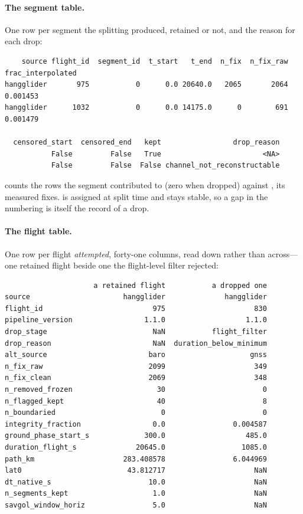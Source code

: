 \begin{revblock}
\paragraph{The segment table.} One row per segment the splitting produced, retained or
not, and the reason for each drop:

{\footnotesize
\begin{verbatim}
    source flight_id  segment_id  t_start   t_end  n_fix  n_fix_raw  frac_interpolated
hangglider       975           0      0.0 20640.0   2065       2064           0.001453
hangglider      1032           0      0.0 14175.0      0        691           0.001479

  censored_start  censored_end   kept                 drop_reason
           False         False   True                        <NA>
           False         False  False channel_not_reconstructable
\end{verbatim}
}

\noindent {} counts the rows the segment contributed to  (zero when
dropped) against , its measured fixes.  is assigned at
split time and stays stable, so a gap in the numbering is itself the record of a drop.

\paragraph{The flight table.} One row per flight \emph{attempted}, forty-one columns, read
down rather than across---one retained flight beside one the flight-level filter rejected:

{\footnotesize
\begin{verbatim}
                     a retained flight           a dropped one
source                      hangglider              hangglider
flight_id                          975                     830
pipeline_version                 1.1.0                   1.1.0
drop_stage                         NaN           flight_filter
drop_reason                        NaN  duration_below_minimum
alt_source                        baro                    gnss
n_fix_raw                         2099                     349
n_fix_clean                       2069                     348
n_removed_frozen                    30                       0
n_flagged_kept                      40                       8
n_boundaried                         0                       0
integrity_fraction                 0.0                0.004587
ground_phase_start_s             300.0                   485.0
duration_flight_s              20645.0                  1085.0
path_km                     283.408578                6.044969
lat0                         43.812717                     NaN
dt_native_s                       10.0                     NaN
n_segments_kept                    1.0                     NaN
savgol_window_horiz                5.0                     NaN
\end{verbatim}
}


\end{revblock}
